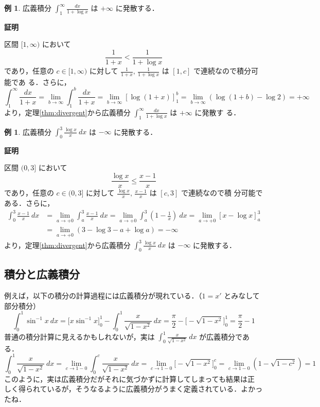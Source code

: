 \documentclass[10pt, uplatex, dvipdfmx]{jsarticle}
\makeatletter
\renewenvironment{proof}[1][\proofname]{\par
  \pushQED{\qed}%
  \normalfont \topsep6\p@\@plus6\p@\relax
  \trivlist
  \item\relax
  {\bfseries
  #1\@addpunct{.}}\hspace\labelsep\ignorespaces
}{%
  \popQED\endtrivlist\@endpefalse
}
\theoremstyle{definition}
\newtheorem{example}[theorem]{例}
\renewcommand{\proofname}{\textbf{証明}}
\numberwithin{equation}{section}
\newcommand{\ds}{\displaystyle}
\makeatother
\begin{document}
\begin{example}
  広義積分 $\ds \int_{1}^{\infty} \frac{dx}{1+\log x}$ は $+\infty$ に発散する．

  \begin{proof}
    区間 $[1,\infty)$ において
    \[
      \frac{1}{1+x} < \frac{1}{1+\log x}
    \]
    であり，任意の $c \in [1, \infty)$ に対して
    $\ds \frac{1}{1+x}, \, \frac{1}{1+\log x}$ は $[1, c]$ で連続なので積分可能であ
    る．さらに，
    \[
      \int_{1}^{\infty} \frac{dx}{1+x} = \lim_{b \to \infty} \int_{1}^{b} \frac{dx}{1+x}
      =\lim_{b \to \infty} \left[ \log (1+x) \right]_{1}^{b}
      = \lim_{b \to \infty} \left( \log(1+b) - \log 2\right) = +\infty
    \]
    より，定理\ref{thm:divergent}から広義積分
    $\ds \int_{1}^{\infty} \frac{dx}{1+\log x}$ は $+\infty$ に発散す
    る．
  \end{proof}
\end{example}

\begin{example}
  広義積分 $\ds \int_{0}^{3} \frac{\log x}{x} \ dx$ は $-\infty$ に発散する．

  \begin{proof}
    区間  $(0,3]$ において
    \[
      \frac{\log x}{x} \leq \frac{x-1}{x}
    \]
    であり，任意の $c \in (0,3]$ に対して
    $\ds \frac{\log x}{x}, \, \frac{x-1}{x}$ は $[c,3]$ で連続なので積
    分可能である．さらに，
    \begin{align*}
      \int_{0}^{3}\frac{x-1}{x} \ dx &= \lim_{a \to +0} \int_{a}^{3} \frac{x-1}{x}\ dx
      = \lim_{a \to +0}\int_{a}^{3} \left( 1-\frac{1}{x}\right)\ dx
      = \lim_{a \to +0}\left[ x-\log x\right]_{a}^{3} \\
      &= \lim_{a \to +0}\left( 3-\log 3 -a + \log a\right)
        =-\infty
    \end{align*}
    より，定理\ref{thm:divergent}から広義積分
    $\ds \int_{0}^{3} \frac{\log x}{x}\ dx$ は $-\infty$ に発散する．
  \end{proof}
\end{example}

\subsection{積分と広義積分}

例えば，以下の積分の計算過程には広義積分が現れている．（$1 = x'$ とみなして部分積分）
\[
  \int_{0}^{1} \sin^{-1} x \ dx = \Big[ x \sin^{-1} x \Big]_{0}^{1} - \int_{0}^{1} \frac{x}{\sqrt{1-x^2}} \ dx
  = \frac{\pi}{2} - \Big[ - \sqrt{1-x^2} \Big]_{0}^{1} = \frac{\pi}{2} - 1
\]
普通の積分計算に見えるかもしれないが，実は
$\ds \int_{0}^{1}\frac{x}{\sqrt{1-x^2}} \ dx$ が広義積分である．
\[
  \int_{0}^{1} \frac{x}{\sqrt{1-x^2}} \ dx = \lim_{c \to 1-0} \int_{0}^{c} \frac{x}{\sqrt{1-x^2}} \ dx
  = \lim_{c \to 1-0} \Big[-\sqrt{1-x^2}\Big]_{0}^{c} = \lim_{c \to 1-0} \left(1- \sqrt{1-c^2} \right) =1
\]
このように，実は広義積分だがそれに気づかずに計算してしまっても結果は正
しく得られているが，そうなるように広義積分がうまく定義されている．よかったね．\\
\end{document}
